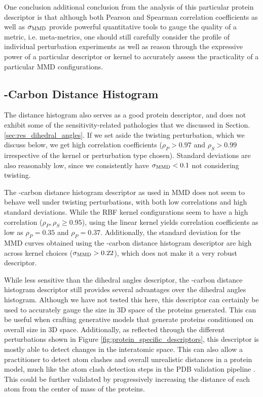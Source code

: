 One conclusion additional conclusion from the analysis of this particular
protein descriptor is that although both Pearson and Spearman correlation
coefficients as well as $\sigma_{\text{MMD}}$ provide powerful quantitative tools to
gauge the quality of a metric, i.e. meta-metrics, one should still carefully
consider the profile of individual perturbation experiments as well as reason
through the expressive power of a particular descriptor or kernel to accurately
assess the practicality of a particular MMD configurations.


\subsection{\textalpha{}-Carbon Distance Histogram}\label{sec:results_dist_hist}

The distance histogram also serves as a good protein descriptor, and does not
exhibit some of the sensitivity-related pathologies that we discussed in Section.
\ref{sec:res_dihedral_angles}. If we set aside the twisting perturbation, which
we discuss below, we get high correlation coefficients ($\rho_P>0.97$ and
$\rho_S>0.99$ irrespective of the kernel or perturbation type chosen). Standard
deviations are also reasonably low, since we consistently have $\sigma_{\text{MMD}}<0.1$
not considering twisting.

The \textalpha{}-carbon distance histogram descriptor as used in MMD does not
seem to behave well under twisting perturbations, with both low correlations and
high standard deviations. While the RBF kernel configurations seem to have a
high correlation ($\rho_P,\rho_S\geq 0.95$), using the linear kernel yields
correlation coefficients as low as $\rho_P=0.35$ and $\rho_P=0.37$.
Additionally, the standard deviation for the MMD curves obtained using the
\textalpha{}-carbon distance histogram descriptor are high across kernel choices
($\sigma_{\text{MMD}}>0.22$), which does not make it a very robust descriptor.

While less sensitive than the dihedral angles descriptor, the
\textalpha{}-carbon distance histogram descriptor still provides several
advantages over the dihedral angles histogram. Although we have not tested
this here, this descriptor can certainly be used to accurately gauge the size in
3D space of the proteins generated. This can be useful when crafting generative
models that generate proteins conditioned on overall size in 3D space.
Additionally, as reflected through the different perturbations shown in Figure
\ref{fig:protein_specific_descriptors}, this descriptor is mostly able to detect
changes in the interatomic space. This can also allow a practitioner to detect
atom clashes and overall unrealistic distances in a protein model, much like the
atom clash detection steps in the PDB validation pipeline \citep{read2011new,
gore2012implementing, gore2017validation}. This could be further validated by
progressively increasing the distance of each atom from the center of mass of
the proteins.

